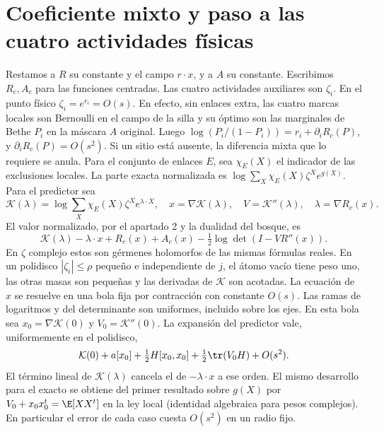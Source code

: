 \section{Coeficiente mixto y paso a las cuatro actividades físicas}
Restamos a $R$ su constante y el campo $r\cdot x$, y a $A$ su constante. Escribimos
$R_c,A_c$ para las funciones centradas. Las cuatro actividades auxiliares son $\zeta_i$.
En el punto físico $\zeta_i=e^{r_i}=O(s)$. En efecto, sin enlaces extra, las cuatro
marcas locales son Bernoulli en el campo de la silla y su óptimo son las marginales de
Bethe $P_i$ en la máscara $A$ original. Luego
$\log(P_i/(1-P_i))=r_i+\partial_iR_c(P)$, y $\partial_iR_c(P)=O(s^2)$.
Si un sitio está ausente, la diferencia mixta que lo requiere se anula.
Para el conjunto de enlaces $E$, sea $\chi_E(X)$ el indicador de las exclusiones locales.
La parte exacta normalizada es $\log\sum_X\chi_E(X)\zeta^X e^{g(X)}$.
Para el predictor sea
\[
 \mathcal K(\lambda)=\log\sum_X\chi_E(X)\zeta^X e^{\lambda\cdot X},\quad
 x=\nabla\mathcal K(\lambda),\quad V=\mathcal K''(\lambda),\quad\lambda=\nabla R_c(x).
\]
El valor normalizado, por el apartado 2 y la dualidad del bosque, es
\[
 \mathcal K(\lambda)-\lambda\cdot x+R_c(x)+A_c(x)-\tfrac12\log\det(I-VR''(x)).
\]
En $\zeta$ complejo estos son gérmenes holomorfos de las mismas fórmulas reales.
En un polidisco $|\zeta_i|\le\rho$ pequeño e independiente de $j$, el átomo vacío
tiene peso uno, las otras masas son pequeñas y las derivadas de $\mathcal K$ son acotadas.
La ecuación de $x$ se resuelve en una bola fija por contracción con constante $O(s)$.
Las ramas de logaritmos y del determinante son uniformes, incluido sobre los ejes.
En esta bola sea $x_0=\nabla\mathcal K(0)$ y $V_0=\mathcal K''(0)$. La expansión del
predictor vale, uniformemente en el polidisco,
\[
 \mathcal K(0)+a[x_0]+\tfrac12 H[x_0,x_0]+\tfrac12\tr(V_0H)+O(s^2).
\]
El término lineal de $\mathcal K(\lambda)$ cancela el de $-\lambda\cdot x$ a ese orden.
El mismo desarrollo para el exacto se obtiene del primer resultado sobre $g(X)$
por $V_0+x_0x_0^t=\E[XX^t]$ en la ley local (identidad algebraica para pesos complejos).
En particular el error de cada caso cuesta $O(s^2)$ en un radio fijo.

